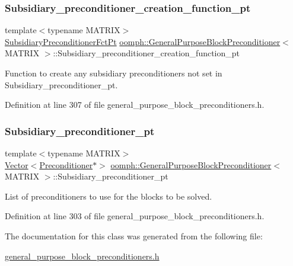 \subsubsection{\texorpdfstring{Subsidiary\+\_\+preconditioner\+\_\+creation\+\_\+function\+\_\+pt}{Subsidiary\_preconditioner\_creation\_function\_pt}}
{\footnotesize\ttfamily template$<$typename M\+A\+T\+R\+IX$>$ \\
\hyperlink{classoomph_1_1GeneralPurposeBlockPreconditioner_a4818c6bde7206cd9b5df4f8c1e3a3c34}{Subsidiary\+Preconditioner\+Fct\+Pt} \hyperlink{classoomph_1_1GeneralPurposeBlockPreconditioner}{oomph\+::\+General\+Purpose\+Block\+Preconditioner}$<$ M\+A\+T\+R\+IX $>$\+::Subsidiary\+\_\+preconditioner\+\_\+creation\+\_\+function\+\_\+pt\hspace{0.3cm}{\ttfamily [protected]}}

Function to create any subsidiary preconditioners not set in Subsidiary\+\_\+preconditioner\+\_\+pt. 

Definition at line 307 of file general\+\_\+purpose\+\_\+block\+\_\+preconditioners.\+h.

\mbox{\label{classoomph_1_1GeneralPurposeBlockPreconditioner_a6bbfedf5de19fd5ee595e73dd8853d41}} 
\subsubsection{\texorpdfstring{Subsidiary\+\_\+preconditioner\+\_\+pt}{Subsidiary\_preconditioner\_pt}}
{\footnotesize\ttfamily template$<$typename M\+A\+T\+R\+IX$>$ \\
\hyperlink{classoomph_1_1Vector}{Vector}$<$\hyperlink{classoomph_1_1Preconditioner}{Preconditioner}$\ast$$>$ \hyperlink{classoomph_1_1GeneralPurposeBlockPreconditioner}{oomph\+::\+General\+Purpose\+Block\+Preconditioner}$<$ M\+A\+T\+R\+IX $>$\+::Subsidiary\+\_\+preconditioner\+\_\+pt\hspace{0.3cm}{\ttfamily [protected]}}



List of preconditioners to use for the blocks to be solved. 



Definition at line 303 of file general\+\_\+purpose\+\_\+block\+\_\+preconditioners.\+h.



The documentation for this class was generated from the following file\+:\begin{DoxyCompactItemize}
\item 
\hyperlink{general__purpose__block__preconditioners_8h}{general\+\_\+purpose\+\_\+block\+\_\+preconditioners.\+h}\end{DoxyCompactItemize}
